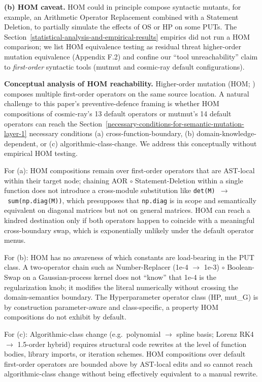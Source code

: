 \documentclass[manuscript,screen,review]{acmart}
\begin{document}
\textbf{(b) HOM caveat.} HOM \citep{c03829bdd1a6e45113092384bf0fa05a064ca54a,kintis2018effective}
could in principle compose syntactic mutants, for example, an Arithmetic
Operator Replacement combined with a Statement Deletion, to partially
simulate the effects of OS or HP on some PUTs. The Section~\ref{statistical-analysis-and-empirical-results} empirics did not
run a HOM comparison; we list HOM equivalence testing as residual threat
higher-order mutation equivalence (Appendix F.2) and confine our ``tool unreachability'' claim to
\emph{first-order} syntactic tools (mutmut and cosmic-ray default
configurations).

\textbf{Conceptual analysis of HOM reachability.} Higher-order mutation
(HOM; \citealp{jia2008subtle,c03829bdd1a6e45113092384bf0fa05a064ca54a,kintis2018effective}) composes multiple first-order operators on the same
source location. A natural challenge to this paper's preventive-defence
framing is whether HOM compositions of cosmic-ray's
13 default operators or mutmut's 14 default operators can reach the Section~\ref{necessary-conditions-for-semantic-mutation-layer-1}
necessary conditions (a) cross-function-boundary, (b)
domain-knowledge-dependent, or (c) algorithmic-class-change. We address
this conceptually without empirical HOM testing.

For (a): HOM compositions remain over first-order operators that are
AST-local within their target node; chaining AOR $\circ$ Statement-Deletion
within a single function does not introduce a cross-module substitution
like \texttt{det(M)\ $\to$\ sum(np.diag(M))}, which presupposes that
\texttt{np.diag} is in scope and semantically equivalent on diagonal
matrices but not on general matrices. HOM can reach a kindred
destination only if both operators happen to coincide with a meaningful
cross-boundary swap, which is exponentially unlikely under the default
operator menus.

For (b): HOM has no awareness of which constants are load-bearing in the
PUT class. A two-operator chain such as Number-Replacer (1e-4 $\to$ 1e-3) $\circ$
Boolean-Swap on a Gaussian-process kernel does not ``know'' that 1e-4 is
the regularization knob; it modifies the literal numerically without
crossing the domain-semantics boundary. The Hyperparameter operator
class (HP, mut\_G) is by construction parameter-aware and
class-specific, a property HOM compositions do not exhibit by default.

For (c): Algorithmic-class change (e.g.~polynomial $\to$ spline basis;
Lorenz RK4 $\to$ 1.5-order hybrid) requires structural code rewrites at the
level of function bodies, library imports, or iteration schemes. HOM
compositions over default first-order operators are bounded above by
AST-local edits and so cannot reach algorithmic-class change without
being effectively equivalent to a manual rewrite.
\end{document}
